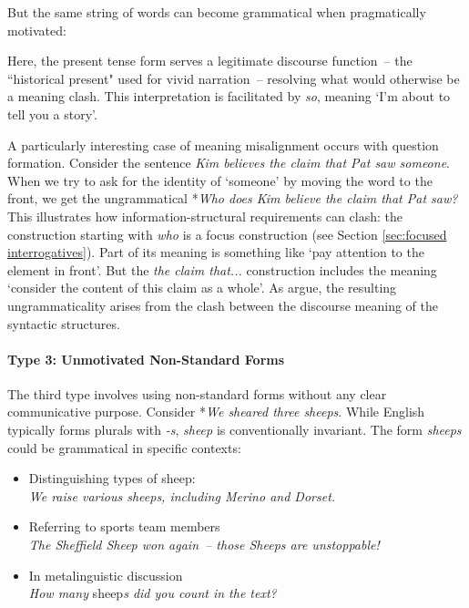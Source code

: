 But the same string of words can become grammatical when pragmatically motivated:
\z

Here, the present tense form serves a legitimate discourse function~-- the ``historical present" used for vivid narration~-- resolving what would otherwise be a meaning clash. This interpretation is facilitated by \textit{so}, meaning `I'm about to tell you a story'.

A particularly interesting case of meaning misalignment occurs with question formation. Consider the sentence \textit{Kim believes the claim that Pat saw someone}. When we try to ask for the identity of `someone' by moving the word to the front, we get the ungrammatical *\textit{Who does Kim believe the claim that Pat saw?} This illustrates how information-structural requirements can clash: the construction starting with \textit{who} is a focus construction (see Section \ref{sec:focused interrogatives}). Part of its meaning is something  like `pay attention to the element in front'. But the \textit{the claim that...} construction includes the meaning `consider the content of this claim as a whole'. As \citet{cuneo_goldberg_2022} argue, the resulting ungrammaticality arises from the clash between the discourse meaning of the syntactic structures.

\paragraph*{Type 3: Unmotivated Non-Standard Forms} The third type involves using non-standard forms without any clear communicative purpose. Consider *\textit{We sheared three sheeps}. While English typically forms plurals with \textit{-s}, \textit{sheep} is conventionally invariant. The form \textit{sheeps} could be grammatical in specific contexts:
\begin{itemize}[noitemsep]
    \item Distinguishing types of sheep: \\\textit{We raise various sheeps, including Merino and Dorset.}
    \item Referring to sports team members \\\textit{The Sheffield Sheep won again~-- those Sheeps are unstoppable!}
    \item In metalinguistic discussion \\\textit{How many }sheep\textit{s did you count in the text?}
\end{itemize}

